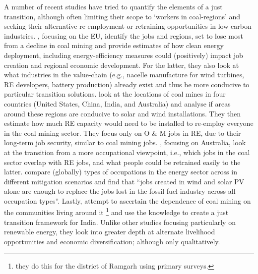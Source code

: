 \documentclass[../thesis.tex]{subfiles}
\begin{document}
A number of recent studies have tried to quantify the elements of a just transition, although often limiting their scope to `workers in coal-regions' and seeking their alternative re-employment or retraining opportunities in low-carbon industries. , focusing on the EU, identify the jobs and regions, set to lose most from a decline in coal mining and provide estimates of how clean energy deployment, including energy-efficiency measures could (positively) impact job creation and regional economic development. For the latter, they also look at what industries in the value-chain (e.g., nacelle manufacture for wind turbines, RE developers, battery production) already exist and thus be more conducive to particular transition solutions. \citet{pai2020} look at the locations of coal mines in four countries (United States, China, India, and Australia) and analyse if areas around these regions are conducive to solar and wind installations. They then estimate how much RE capacity would need to be installed to re-employ everyone in the coal mining sector. They focus only on O \& M jobs in RE, due to their long-term job security, similar to coal mining jobs. \citet{briggs2020}, focusing on Australia, look at the transition from a more occupational viewpoint, i.e., which jobs in the coal sector overlap with RE jobs, and what people could be retrained easily to the latter. \citet{dominish2019} compare (globally) types of occupations in the energy sector across in different mitigation scenarios and find that ``jobs created in wind and solar PV alone are enough to replace the jobs lost in the fossil fuel industry across all occupation types''. Lastly, \citet{bhushan2020} attempt to ascertain the dependence of coal mining on the communities living around it \footnote{they do this for the district of Ramgarh using primary surveys.} and use the knowledge to create a just transition framework for India. Unlike other studies focusing particularly on renewable energy, they look into greater depth at alternate livelihood opportunities and economic diversification; although only qualitatively.
\end{document}
